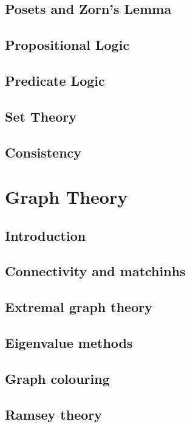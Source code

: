 \documentclass[12pt]{book}
\theoremstyle{definition}
\theoremstyle{remark}
\begin{document}
		\section{Posets and Zorn's Lemma}
		
		\section{Propositional Logic}
		
		\section{Predicate Logic}
		
		\section{Set Theory}
		
		\section{Consistency}
		
	\chapter{Graph Theory}
		\section{Introduction}
		
		\section{Connectivity and matchinhs}
		
		\section{Extremal graph theory}
		
		\section{Eigenvalue methods}
		
		\section{Graph colouring}
		
		\section{Ramsey theory}
		
\end{document}
